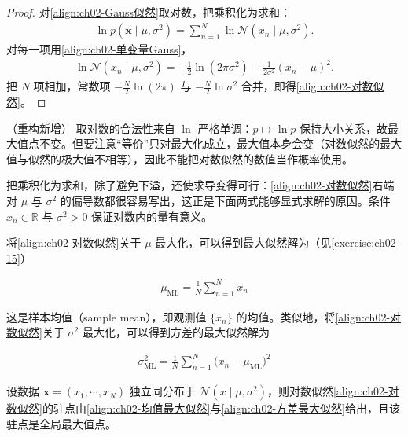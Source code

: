 \documentclass[../../main.tex]{subfiles}
\begin{document}
\begin{proof}
对\eqref{align:ch02-Gauss似然}取对数，把乘积化为求和：
\begin{align*}
  \ln p(\mathbf{x}\mid\mu,\sigma^{2}) = \sum_{n=1}^{N}\ln\mathcal{N}(x_n\mid\mu,\sigma^{2}) .
\end{align*}
对每一项用\eqref{align:ch02-单变量Gauss}，
\begin{align*}
  \ln\mathcal{N}(x_n\mid\mu,\sigma^{2}) = -\frac{1}{2}\ln(2\pi\sigma^{2}) - \frac{1}{2\sigma^{2}}(x_n-\mu)^{2} .
\end{align*}
把 $N$ 项相加，常数项 $-\frac{N}{2}\ln(2\pi)$ 与 $-\frac{N}{2}\ln\sigma^{2}$ 合并，即得\eqref{align:ch02-对数似然}。
\end{proof}

\begin{remark}（重构新增）
取对数的合法性来自 $\ln$ 严格单调：$p\mapsto\ln p$ 保持大小关系，故最大值点不变。但要注意“等价”只对最大化成立，最大值本身会变（对数似然的最大值与似然的极大值不相等），因此不能把对数似然的数值当作概率使用。

把乘积化为求和，除了避免下溢，还使求导变得可行：\eqref{align:ch02-对数似然}右端对 $\mu$ 与 $\sigma^{2}$ 的偏导数都很容易写出，这正是下面两式能够显式求解的原因。条件 $x_n\in\mathbb{R}$ 与 $\sigma^{2}>0$ 保证对数内的量有意义。
\end{remark}

将\eqref{align:ch02-对数似然}关于 $\mu$ 最大化，可以得到最大似然解为（见\cref{exercise:ch02-15}）

\begin{align}
  \mu_{\mathrm{ML}} = \frac{1}{N}\sum_{n=1}^{N} x_n
  \label{align:ch02-均值最大似然}
\end{align}

这是样本均值（sample mean），即观测值 $\{x_n\}$ 的均值。类似地，将\eqref{align:ch02-对数似然}关于 $\sigma^{2}$ 最大化，可以得到方差的最大似然解为

\begin{align}
  \sigma_{\mathrm{ML}}^{2} = \frac{1}{N}\sum_{n=1}^{N}\big(x_n-\mu_{\mathrm{ML}}\big)^{2}
  \label{align:ch02-方差最大似然}
\end{align}

\begin{theorem}\label{theorem:ch02-Gauss最大似然}
设数据 $\mathbf{x}=(x_1,\cdots,x_N)$ 独立同分布于 $\mathcal{N}(x\mid\mu,\sigma^{2})$，则对数似然\eqref{align:ch02-对数似然}的驻点由\eqref{align:ch02-均值最大似然}与\eqref{align:ch02-方差最大似然}给出，且该驻点是全局最大值点。
\end{theorem}
\end{document}
